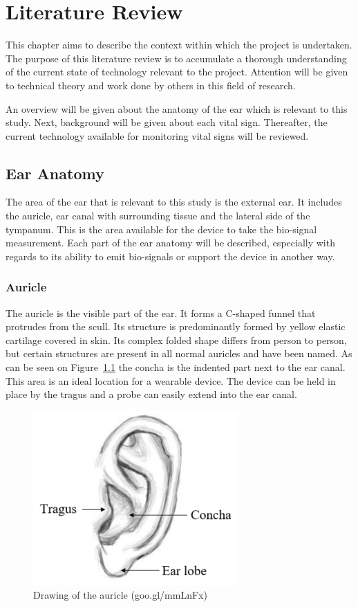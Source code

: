 \chapter{Literature Review}
\label{chp:LitReview}
This chapter aims to describe the context within which the project is undertaken. The purpose of this literature review is to accumulate a thorough understanding of the current state of technology relevant to the project. Attention will be given to technical theory and work done by others in this field of research.

An overview will be given about the anatomy of the ear which is relevant to this study. Next, background will be given about each vital sign. Thereafter, the current technology available for monitoring vital signs will be reviewed.

\section{Ear Anatomy}
The area of the ear that is relevant to this study is the external ear. It includes the auricle, ear canal with surrounding tissue and the lateral side of the tympanum. This is the area available for the device to take the bio-signal measurement. Each part of the ear anatomy will be described, especially with regards to its ability to emit bio-signals or support the device in another way.

\subsection{Auricle}
The auricle is the visible part of the ear. It forms a C-shaped funnel that protrudes from the scull. Its structure is predominantly formed by yellow elastic cartilage covered in skin. Its complex folded shape differs from person to person, but certain structures are present in all normal auricles and have been named. As can be seen on Figure~\ref{fig:AuricleLabel} the concha is the indented part next to the ear canal. This area is an ideal location for a wearable device. The device can be held in place by the tragus and a probe can easily extend into the ear canal.

\begin{figure}
   \centering
   \includegraphics[scale=1]{figs/AuricleLabel}
   \caption{Drawing of the auricle (goo.gl/mmLnFx)}
   \label{fig:AuricleLabel}
\end{figure}

